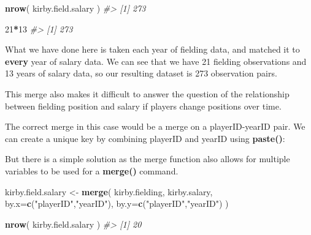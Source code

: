 \documentclass[]{book}
\newenvironment{Shaded}{\begin{snugshade}}{\end{snugshade}}
\newcommand{\CommentTok}[1]{\textcolor[rgb]{0.56,0.35,0.01}{\textit{#1}}}
\newcommand{\DataTypeTok}[1]{\textcolor[rgb]{0.13,0.29,0.53}{#1}}
\newcommand{\DecValTok}[1]{\textcolor[rgb]{0.00,0.00,0.81}{#1}}
\newcommand{\KeywordTok}[1]{\textcolor[rgb]{0.13,0.29,0.53}{\textbf{#1}}}
\newcommand{\NormalTok}[1]{#1}
\newcommand{\OperatorTok}[1]{\textcolor[rgb]{0.81,0.36,0.00}{\textbf{#1}}}
\newcommand{\StringTok}[1]{\textcolor[rgb]{0.31,0.60,0.02}{#1}}
\theoremstyle{definition}
\theoremstyle{definition}
\theoremstyle{definition}
\theoremstyle{remark}
\begin{document}
\begin{Shaded}
\begin{Highlighting}[]
\KeywordTok{nrow}\NormalTok{( kirby.field.salary )}
\CommentTok{#> [1] 273}

\DecValTok{21}\OperatorTok{*}\DecValTok{13}
\CommentTok{#> [1] 273}
\end{Highlighting}
\end{Shaded}

What we have done here is taken each year of fielding data, and matched
it to \textbf{every} year of salary data. We can see that we have 21
fielding observations and 13 years of salary data, so our resulting
dataset is 273 observation pairs.

This merge also makes it difficult to answer the question of the
relationship between fielding position and salary if players change
positions over time.

The correct merge in this case would be a merge on a playerID-yearID
pair. We can create a unique key by combining playerID and yearID using
\textbf{paste()}:

\begin{Shaded}
\end{Shaded}

But there is a simple solution as the merge function also allows for
multiple variables to be used for a \textbf{merge()} command.

\begin{Shaded}
\begin{Highlighting}[]

\NormalTok{kirby.field.salary <-}\StringTok{ }\KeywordTok{merge}\NormalTok{( kirby.fielding, kirby.salary, }
                            \DataTypeTok{by.x=}\KeywordTok{c}\NormalTok{(}\StringTok{"playerID"}\NormalTok{,}\StringTok{"yearID"}\NormalTok{), }
                            \DataTypeTok{by.y=}\KeywordTok{c}\NormalTok{(}\StringTok{"playerID"}\NormalTok{,}\StringTok{"yearID"}\NormalTok{)   )}

\KeywordTok{nrow}\NormalTok{( kirby.field.salary )}
\CommentTok{#> [1] 20}
\end{Highlighting}
\end{Shaded}
\end{document}
